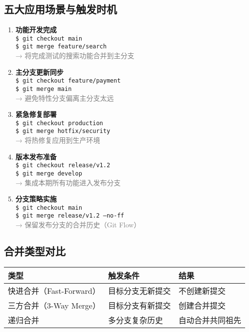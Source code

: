 \subsection{五大应用场景与触发时机}
\begin{enumerate}[leftmargin=*, nosep]
    \item \textbf{功能开发完成} \\
    \texttt{\$ git checkout main} \\
    \texttt{\$ git merge feature/search} \\
    \textcolor{gray}{→ 将完成测试的搜索功能合并到主分支}
    
    \item \textbf{主分支更新同步} \\
    \texttt{\$ git checkout feature/payment} \\
    \texttt{\$ git merge main} \\
    \textcolor{gray}{→ 避免特性分支偏离主分支太远}
    
    \item \textbf{紧急修复部署} \\
    \texttt{\$ git checkout production} \\
    \texttt{\$ git merge hotfix/security} \\
    \textcolor{gray}{→ 将热修复应用到生产环境}
    
    \item \textbf{版本发布准备} \\
    \texttt{\$ git checkout release/v1.2} \\
    \texttt{\$ git merge develop} \\
    \textcolor{gray}{→ 集成本期所有功能进入发布分支}
    
    \item \textbf{分支策略实施} \\
    \texttt{\$ git checkout main} \\
    \texttt{\$ git merge release/v1.2 --no-ff} \\
    \textcolor{gray}{→ 保留发布分支的合并历史（Git Flow）}
\end{enumerate}

\subsection{合并类型对比}
\begin{center}
\begin{tabular}{@{}lll@{}}
    \toprule
    \textbf{类型} & \textbf{触发条件} & \textbf{结果} \\
    \midrule
    快进合并（Fast-Forward） & 目标分支无新提交 & 不创建新提交 \\
    三方合并（3-Way Merge） & 目标分支有新提交 & 创建合并提交 \\
    递归合并 & 多分支复杂历史 & 自动合并共同祖先 \\
    \bottomrule
\end{tabular}
\end{center}

